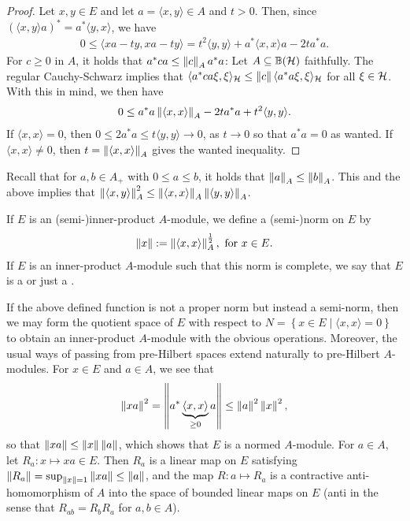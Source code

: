 \begin{proof}
Let $x,y \in E$ and let $a = \langle x,y \rangle \in A$ and $t >0$. Then, since $(\langle x,y \rangle a)^* = a^*\langle y,x\rangle$, we have
\begin{align*}
	0 \leq \langle xa-ty,xa-ty\rangle =t^2\langle y,y \rangle + a^* \langle x,x \rangle a-2ta^*a.
\end{align*}
For $c \geq 0 $ in $A$, it holds that $a^*c a \leq \left\lVert c \right\rVert_A a^*a$: Let $A \subseteq \mathbb{B}(\mathcal{H})$ faithfully. The regular Cauchy-Schwarz implies that $\langle a^*ca \xi,\xi\rangle_{\mathcal{H}} \leq \left\lVert c \right\rVert \langle a^*a \xi,\xi\rangle_{\mathcal{H}}$ for all $ \xi \in \mathcal{H}$. With this in mind, we then have
\begin{align*}
	0 \leq  a^*a \left\lVert \langle x , x \rangle \right\rVert_A -2t a^*a + t^2 \langle y, y \rangle.
\end{align*}
If $\langle x , x \rangle = 0$, then $0 \leq 2a^*a \leq t \langle y , y\rangle \to 0$, as $t \to 0$ so that $a^*a = 0$ as wanted. If $\langle x , x \rangle \neq 0$, then $t = \left\lVert \langle x,x\rangle\right\rVert_A$ gives the wanted inequality.
\end{proof}
Recall that for $a,b \in A_+$ with $0 \leq a \leq b$, it holds that $\left\lVert a \right\rVert_A \leq \left\lVert b \right\rVert_A$. This and the above implies that $\left\lVert \langle x,y \rangle\right\rVert_A^2 \leq \left\lVert \langle x, x \rangle \right\rVert_A \left\lVert \langle y,y\rangle \right\rVert_A$. 
\begin{definition}
	If $E$ is an (semi-)inner-product $A$-module, we define a (semi-)norm on $E$ by
	\begin{align*}
		\left\lVert x \right\rVert := \left\lVert \langle x , x \rangle\right\rVert_A^{\frac12}, \text{ for } x \in E.
	\end{align*}
	If $E$ is an inner-product $A$-module such that this norm is complete, we say that $E$ is a  or just a .
\end{definition}
If the above defined function is not a proper norm but instead a semi-norm, then we may form the quotient space of $E$ with respect to $N=\left\{ x \in E \mid \langle x , x \rangle = 0 \right\}$ to obtain an inner-product $A$-module with the obvious operations. Moreover, the usual ways of passing from pre-Hilbert spaces extend naturally to pre-Hilbert $A$-modules. For $x \in E$ and $a \in A$, we see that
\begin{align*}
	\left\lVert x a \right\rVert^2 = \left\lVert a^* \underbrace{\langle x, x \rangle}_{\geq 0} a \right\rVert \leq \left\lVert a \right\rVert^2 \left\lVert x \right\rVert^2,
\end{align*}
so that $\left\lVert x a \right\rVert \leq \left\lVert x \right\rVert \left\lVert a \right\rVert$, which shows that $E$ is a normed $A$-module. For $a \in A$, let $R_a \colon x \mapsto xa \in E$. Then $R_a$ is a linear map on $E$ satisfying $\left\lVert R_a\right\rVert = \sup_{\left\lVert x \right\rVert = 1} \left\lVert xa \right\rVert \leq \left\lVert a \right\rVert$, and the map $R \colon a \mapsto R_a$ is a contractive anti-homomorphism of $A$ into the space of bounded linear maps on $E$ (anti in the sense that $R_{ab}=R_bR_a$ for $a,b \in A$).




